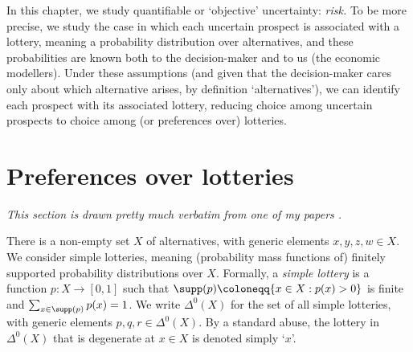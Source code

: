 




In this chapter, we study quantifiable or `objective' uncertainty: \emph{risk.} To be more precise, we study the case in which each uncertain prospect is associated with a lottery, meaning a probability distribution over alternatives, and these probabilities are known both to the decision-maker and to us (the economic modellers). Under these assumptions (and given that the decision-maker cares only about which alternative arises, by definition `alternatives'), we can identify each prospect with its associated lottery, reducing choice among uncertain prospects to choice among (or preferences over) lotteries.



\section{Preferences over lotteries}
\label{risk:lotteries}

\emph{This section is drawn pretty much verbatim from one of my papers \parencite{oo}.}

There is a non-empty set $X$ of alternatives, with generic elements $x,y,z,w \in X$. We consider simple lotteries, meaning (probability mass functions of) finitely supported probability distributions over $X$. Formally, a \emph{simple lottery} is a function $p : X \to [0,1]$ such that $\supp(p) \coloneqq \{ x \in X : p(x) > 0 \}$ is finite and $\sum_{x \in \supp(p)} p(x) = 1$. We write $\Delta^0(X)$ for the set of all simple lotteries, with generic elements $p,q,r \in \Delta^0(X)$. By a standard abuse, the lottery in $\Delta^0(X)$ that is degenerate at $x \in X$ is denoted simply `$x$'.

